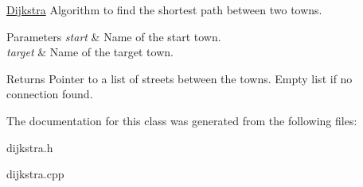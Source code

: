 \hyperlink{class_dijkstra}{Dijkstra} Algorithm to find the shortest path between two towns. 


\begin{DoxyParams}{Parameters}
{\em start} & Name of the start town. \\
\hline
{\em target} & Name of the target town.\\
\hline
\end{DoxyParams}
\begin{DoxyReturn}{Returns}
Pointer to a list of streets between the towns. Empty list if no connection found. 
\end{DoxyReturn}


The documentation for this class was generated from the following files\+:\begin{DoxyCompactItemize}
\item 
dijkstra.\+h\item 
dijkstra.\+cpp\end{DoxyCompactItemize}
